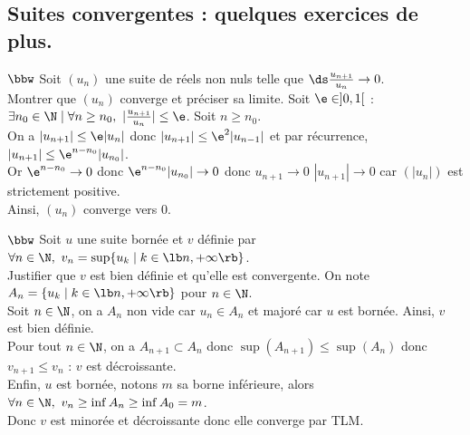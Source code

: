 \documentclass[11pt]{article}
\begin{document}
\subsection*{Suites convergentes : quelques exercices de plus.}

\begin{exercice}{$\bbw$}{}
    Soit $(u_n)$ une suite de réels non nuls telle que $\ds\frac{u_{n+1}}{u_n}\to0$.\\
    Montrer que $(u_n)$ converge et préciser sa limite.
    \tcblower
    Soit $\e\in]0,1[$ : $\exists n_0 \in \N \mid \forall n \geq n_0, ~ |\frac{u_{n+1}}{u_n}| \leq \e$. Soit $n\geq n_0$.\\
    On a $|u_{n+1}|\leq\e|u_n|$ donc $|u_{n+1}|\leq\e^2|u_{n-1}|$ et par récurrence, $|u_{n+1}|\leq\e^{n-n_0}|u_{n_0}|$.\\
    Or $\e^{n-n_0}\to0$ donc $\e^{n-n_0}|u_{n_0}|\to 0$ donc $u_{n+1}\to0$ $|u_{n+1}|\to0$ car $(|u_n|)$ est strictement positive.\\
    Ainsi, $(u_n)$ converge vers 0. 
\end{exercice}

\begin{exercice}{$\bbw$}{}
    Soit $u$ une suite bornée et $v$ définie par $\forall n \in \N, ~ v_n = \sup\{u_k \mid k \in \lb n, +\infty \rb\}$.\\
    Justifier que $v$ est bien définie et qu'elle est convergente.
    \tcblower
    On note $A_n = \{u_k \mid k \in \lb n, +\infty \rb\}$ pour $n\in\N$.\\
    Soit $n\in\N$, on a $A_n$ non vide car $u_n\in A_n$ et majoré car $u$ est bornée. Ainsi, $v$ est bien définie.\\
    Pour tout $n\in\N$, on a $A_{n+1} \subset A_n$ donc $\sup(A_{n+1}) \leq \sup(A_n)$ donc $v_{n+1} \leq v_n$ : $v$ est décroissante.\\
    Enfin, $u$ est bornée, notons $m$ sa borne inférieure, alors $\forall n \in \N, ~ v_n \geq \inf A_n \geq \inf A_0 = m$.\\
    Donc $v$ est minorée et décroissante donc elle converge par TLM.
\end{exercice}
\end{document}
